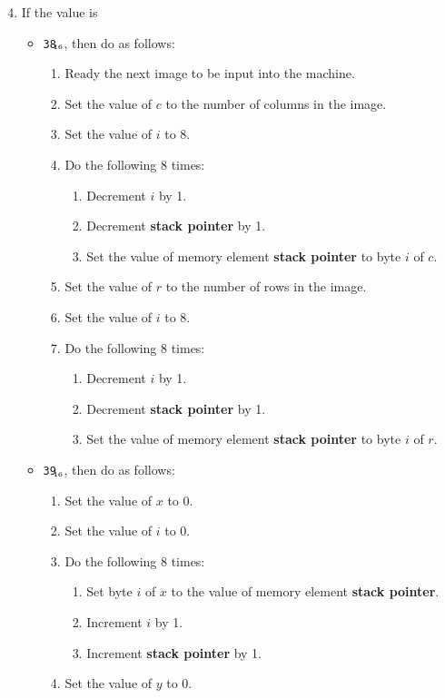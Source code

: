 \documentclass[a4paper,11pt]{article}
\newcommand{\SP}{\textbf{stack pointer}\xspace}
\newcommand{\num}[1]{\texttt{#1}\xspace}
\newcommand{\hex}[1]{\num{#1}$_{\textup{\tiny\hskip-1ex 16}}$\xspace}
\begin{document}
\begin{enumerate}
  \setcounter{enumi}{3}
\item If the value is
  \begin{itemize}
  \item \hex{38}, then do as follows:
    \begin{enumerate}
    \item Ready the next image to be input into the machine.
    \item Set the value of $c$ to the number of columns in the image.
    \item Set the value of $i$ to 8.
    \item Do the following 8 times:
      \begin{enumerate}
      \item Decrement $i$ by 1.
      \item Decrement \SP by 1.
      \item Set the value of memory element \SP to byte $i$ of $c$.
      \end{enumerate}
    \item Set the value of $r$ to the number of rows in the image.
    \item Set the value of $i$ to 8.
    \item Do the following 8 times:
      \begin{enumerate}
      \item Decrement $i$ by 1.
      \item Decrement \SP by 1.
      \item Set the value of memory element \SP to byte $i$ of $r$.
      \end{enumerate}
    \end{enumerate}
  \item \hex{39}, then do as follows:
    \begin{enumerate}
    \item Set the value of $x$ to 0.
    \item Set the value of $i$ to 0.
    \item Do the following 8 times:
      \begin{enumerate}
      \item Set byte $i$ of $x$ to the value of memory element \SP.
      \item Increment $i$ by 1.
      \item Increment \SP by 1.
      \end{enumerate}
    \item Set the value of $y$ to 0.

\end{enumerate}
\end{itemize}
\end{enumerate}
\end{document}
